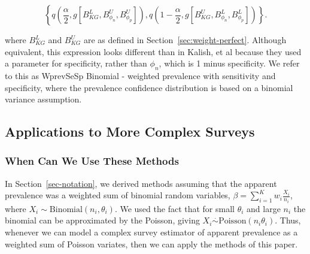 \documentclass[AMA,STIX1COL]{WileyNJD-v2}
\begin{document}
\begin{equation}
    \left\{ q \left( \frac{\alpha}{2}, g\left[B_{KG}^L, B_{\phi_n}^U, B_{\phi_p}^U\right]  \right),  q \left( 1 - \frac{\alpha}{2}, g\left[B_{KG}^U, B_{\phi_n}^L, B_{\phi_p}^L\right]  \right) \right\}.
\end{equation}

where \( B_{KG}^L \) and \( B_{KG}^U \) are as defined in Section~\ref{sec:weight-perfect}. Although equivalent, this expression looks different than in Kalish, et al\cite{Kali:2021} because they used a parameter for specificity, rather than $\phi_n$, which is 1 minus specificity. 
We refer to this as WprevSeSp Binomial - weighted prevalence with sensitivity and specificity, where the prevalence confidence distribution is based on a binomial variance assumption.

\subsection{Applications to More Complex Surveys}
\label{sec:complex-surveys}


\subsubsection{When Can We Use These Methods}

In Section~\ref{sec-notation}, we derived methods assuming that the apparent prevalence was a weighted sum of binomial random variables,
$\beta = \sum_{i=1}^{K} w_i \frac{X_i}{n_i}$, where $X_i \sim \textrm{Binomial}(n_i,\theta_i)$. We used the fact that for small $\theta_i$ and large $n_i$
the binomial can be approximated by the Poisson, giving $X_i \stackrel{\cdot}{\sim} \textrm{Poisson}( n_i \theta_i)$.
Thus, whenever we can model a complex survey estimator of apparent prevalence as a weighted sum of Poisson variates, then we can apply the methods of this paper.
\end{document}
